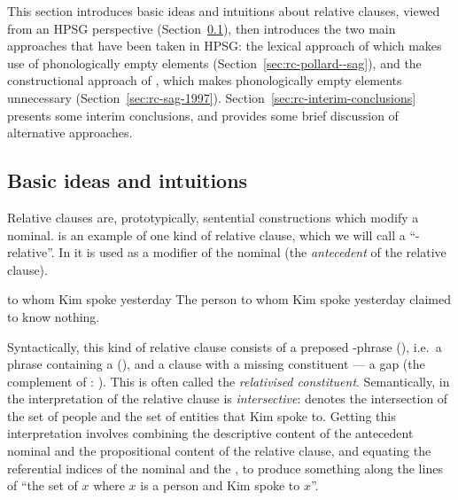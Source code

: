 \documentclass[output=paper
 	        ,biblatex
                ,babelshorthands
                ,newtxmath
                ,draftmode
                ,colorlinks, citecolor=brown
]{langscibook}
\begin{document}
This section introduces basic ideas and intuitions about relative clauses, viewed from an
HPSG perspective (Section~\ref{sec:rc-basic-}), then introduces the two main approaches that
have been taken in HPSG: the lexical approach of \citet{Pollard:Sag:94} which makes use of
phonologically empty elements (Section~\ref{sec:rc-pollard--sag}), and the constructional
approach of \citet{Sag:97}, which makes phonologically empty elements unnecessary (Section~\ref{sec:rc-sag-1997}).
Section~\ref{sec:rc-interim-conclusions} presents some interim conclusions, and 
provides some brief discussion of alternative approaches.

\subsection{Basic ideas and intuitions}
\label{sec:rc-basic-}

Relative clauses  are, prototypically, sentential constructions which modify a
nominal.   is an example of one kind of  relative clause, which we will call a
``-relative''. In  it is used  as a modifier of the nominal 
(the \emph{antecedent} of the relative clause).
\begin{exe}\label{x:rc-2}
  \ex\label{x:rc-3} to whom Kim spoke yesterday
  \ex\label{x:rc-4} The person to whom Kim spoke yesterday claimed to know nothing.
\end{exe}
Syntactically, this kind of relative clause consists of a preposed -phrase
(), i.e.\ a phrase containing a  (), and a
clause with a missing constituent --- a gap (the complement of : ). This is often called the \emph{relativised constituent}.
Semantically, in  the interpretation of the relative clause is
\emph{intersective}:  denotes the intersection of the set of people and the
set of entities that Kim spoke to. Getting this interpretation involves combining the
descriptive content of the antecedent nominal and the propositional content of the
relative clause, and equating the referential indices of the nominal and the , to produce something along the lines of ``the set of $x$ where $x$ is a person
and Kim spoke to $x$''.
\end{document}
